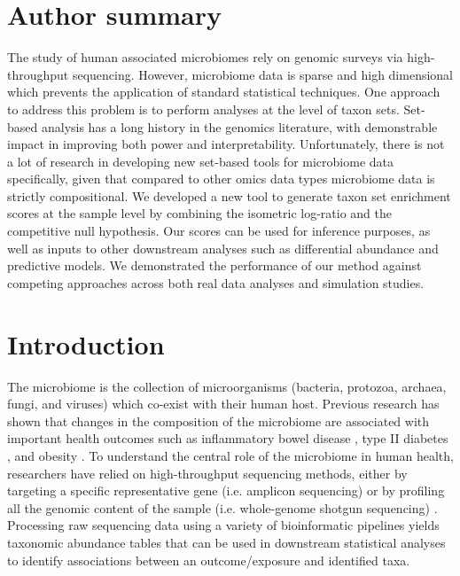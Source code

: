 \documentclass[10pt,letterpaper]{article}
\begin{document}
\section*{Author summary}
The study of human associated microbiomes rely on genomic surveys via high-throughput sequencing. However, microbiome data is sparse and high dimensional which prevents the application of standard statistical techniques. One approach to address this problem is to perform analyses at the level of taxon sets. Set-based analysis has a long history in the genomics literature, with demonstrable impact in improving both power and interpretability. Unfortunately, there is not a lot of research in developing new set-based tools for microbiome data specifically, given that compared to other omics data types microbiome data is strictly compositional. We developed a new tool to generate taxon set enrichment scores at the sample level by combining the isometric log-ratio and the competitive null hypothesis. Our scores can be used for inference purposes, as well as inputs to other downstream analyses such as differential abundance and predictive models. We demonstrated the performance of our method against competing approaches across both real data analyses and simulation studies. 

\linenumbers

\section*{Introduction}
The microbiome is the collection of microorganisms (bacteria, protozoa, archaea, fungi, and viruses) which co-exist with their human host. Previous research has shown that changes in the composition of the microbiome are associated with important health outcomes such as inflammatory bowel disease \cite{proctor2019}, type II diabetes \cite{sharma2019}, and obesity \cite{aoun2020}. To understand the central role of the microbiome in human health, researchers have relied on high-throughput sequencing methods, either by targeting a specific representative gene (i.e. amplicon sequencing) or by profiling all the genomic content of the sample (i.e. whole-genome shotgun sequencing) \cite{cho2012}. Processing raw sequencing data using a variety of bioinformatic pipelines \cite{callahan2016,truong2015} yields taxonomic abundance tables that can be used in downstream statistical analyses to identify associations between an outcome/exposure and identified taxa.  
\end{document}
